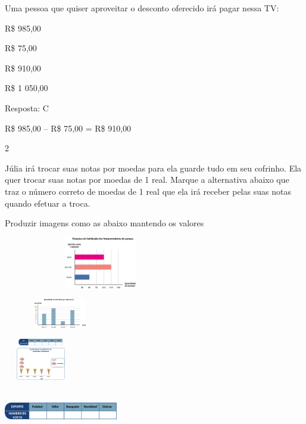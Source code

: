\begin{escolha}
\begin{escolha}
Uma pessoa que quiser aproveitar o desconto oferecido irá pagar nessa
TV:

\begin{escolha}

\item
  R\$ 985,00
\item
  R\$ 75,00
\item
  R\$ 910,00
\item
  R\$ 1 050,00
\end{escolha}

Resposta: C

R\$ 985,00 -- R\$ 75,00 = R\$ 910,00

\num{2}

Júlia irá trocar suas notas por moedas para ela guarde tudo em seu
cofrinho. Ela quer trocar suas notas por moedas de 1 real. Marque a
alternativa abaixo que traz o número correto de moedas de 1 real que ela
irá receber pelas suas notas quando efetuar a troca.

Produzir imagens como as abaixo mantendo os valores

\includegraphics[width=3.34196in,height=0.88341in]{media/image82.png}

\begin{escolha}

\item
\includegraphics[width=1.93350in,height=0.50004in]{media/image83.png}

\item
\includegraphics[width=1.26678in,height=0.72506in]{media/image84.png}

\item
\includegraphics[width=1.95850in,height=0.69173in]{media/image85.png}


\end{escolha}
\end{escolha}
\end{escolha}
